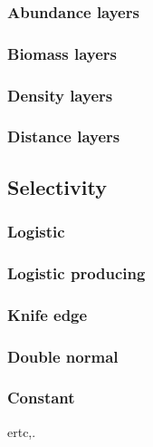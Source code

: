 \subsubsection{Abundance layers}

\subsubsection{Biomass layers}

\subsubsection{Density layers}

\subsubsection{Distance layers}

\subsection{Selectivity}

\subsubsection{Logistic}

\subsubsection{Logistic producing}

\subsubsection{Knife edge}

\subsubsection{Double normal}

\subsubsection{Constant}

ertc,.
